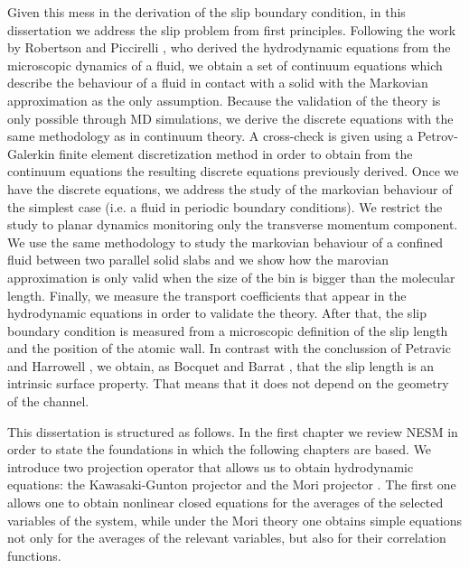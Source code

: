 \documentclass[b5paper,openright,10pt]{book}
\begin{document}
Given this mess in the derivation of the slip boundary condition, in this dissertation we address the slip problem from first principles. Following the work by Robertson \cite{Robertson1966} and Piccirelli \cite{Piccirelli1968}, who derived the hydrodynamic equations from the microscopic dynamics of a fluid, we obtain a set of continuum equations which describe the behaviour of a fluid in contact with a solid with the Markovian approximation as the only assumption. 
Because the validation of the theory is only possible through MD simulations, we derive the discrete equations with the same methodology as in continuum theory. 
A cross-check is given using a Petrov-Galerkin  finite element discretization method in order to obtain from the continuum equations the resulting discrete equations previously derived.  
Once we have the discrete equations, we address the study of the markovian behaviour of the simplest case (i.e. a fluid in periodic boundary conditions). We restrict the study to planar dynamics monitoring only the transverse momentum component. We use the same methodology to study the markovian behaviour of a confined fluid between two parallel solid slabs and we show how the marovian approximation is only valid when the size of the bin is bigger than the molecular length. Finally, we measure the transport coefficients that appear in the hydrodynamic equations in order to validate the theory. 
After that, the slip boundary condition is measured from a microscopic definition of the slip length and the position of the atomic wall.
In contrast with the conclussion of Petravic and Harrowell \cite{Petravic2007}, we obtain, as Bocquet and Barrat \cite{Bocquet1994}, that the slip length is an intrinsic surface property. That means that it does not depend on the geometry of the channel. 

This dissertation is structured as follows. 
In the first chapter we review NESM in order to state the foundations in which the following chapters are based. 
We introduce two projection operator that allows us to obtain hydrodynamic equations: the Kawasaki-Gunton projector \cite{Kawasaki1973} and the Mori projector \cite{Mori1965}.  The first one allows one to obtain  nonlinear closed equations
for  the  averages  of   the  selected  variables of the system, while under the Mori theory one obtains simple equations not only for the averages of the relevant variables, but also for their correlation functions. 
\end{document}
